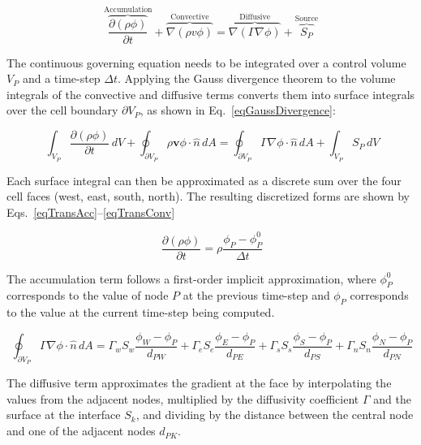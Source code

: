 \begin{equation} \label{eqTransGov}
    \overbrace{\frac{\partial (\rho \phi)}{\partial t}}^{\text{Accumulation}} + \overbrace{\nabla (\rho v \phi)}^{\text{Convective}} = \overbrace{\nabla (\Gamma \nabla \phi)}^{\text{Diffusive}} + \overbrace{S_{P}}^{\text{Source}}
\end{equation}

The continuous governing equation needs to be integrated over a control volume $V_P$ and a time-step $\Delta t$. Applying the Gauss divergence theorem to the volume integrals of the convective and diffusive terms converts them into surface integrals over the cell boundary $\partial V_P$, as shown in Eq.~\eqref{eqGaussDivergence}:

\begin{equation}~\label{eqGaussDivergence}
    \int_{V_P} \frac{\partial (\rho \phi)}{\partial t} \, dV + \oint_{\partial V_P} \rho \mathbf{v} \phi \cdot \hat{n} \, dA = \oint_{\partial V_P} \Gamma \nabla \phi \cdot \hat{n} \, dA + \int_{V_P} S_P \, dV
\end{equation}

Each surface integral can then be approximated as a discrete sum over the four cell faces (west, east, south, north). The resulting discretized forms are shown by Eqs.~\eqref{eqTransAcc}--\eqref{eqTransConv}

\begin{equation}~\label{eqTransAcc}
	\frac{\partial (\rho \phi)}{\partial t} = \rho \frac{\phi_P - \phi^0_P}{\Delta t}
\end{equation}

The accumulation term follows a first-order implicit approximation, where $\phi^0_P$ corresponds to the value of node $P$ at the previous time-step and $\phi_P$ corresponds to the value at the current time-step being computed.

\begin{equation}~\label{eqTransDiff}
    \oint_{\partial V_P} \Gamma \nabla \phi \cdot \hat{n} \, dA = \Gamma_w S_w \frac{\phi_W - \phi_P}{d_{PW}} + \Gamma_e S_e \frac{\phi_E - \phi_P}{d_{PE}} + \Gamma_s S_s \frac{\phi_S - \phi_P}{d_{PS}} + \Gamma_n S_n \frac{\phi_N - \phi_P}{d_{PN}}
\end{equation}

The diffusive term approximates the gradient at the face by interpolating the values from the adjacent nodes, multiplied by the diffusivity coefficient $\Gamma$ and the surface at the interface $S_k$, and dividing by the distance between the central node and one of the adjacent nodes $d_{PK}$.


